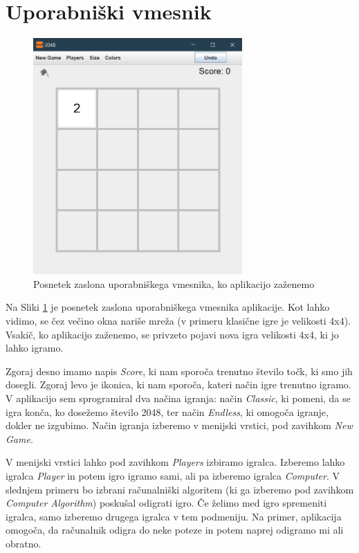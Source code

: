 \documentclass{article}
\begin{document}
\section{Uporabniški vmesnik}

\begin{figure}[ht!]
\centering
\includegraphics[width=8cm]{ui.jpg}
\caption{Posnetek zaslona uporabniškega vmesnika, ko aplikacijo zaženemo}
\label{ui}
\end{figure}

Na Sliki \ref{ui} je posnetek zaslona uporabniškega vmesnika aplikacije. Kot lahko vidimo, se čez večino okna nariše mreža (v primeru klasične igre je velikosti 4x4). Vsakič, ko aplikacijo zaženemo, se privzeto pojavi nova igra velikosti 4x4, ki jo lahko igramo. 

Zgoraj desno imamo napis \emph{Score}, ki nam sporoča trenutno število točk, ki smo jih dosegli. Zgoraj levo je ikonica, ki nam sporoča, kateri način igre trenutno igramo. V aplikacijo sem sprogramiral dva načina igranja: način \emph{Classic}, ki pomeni, da se igra konča, ko dosežemo število 2048, ter način \emph{Endless}, ki omogoča igranje, dokler ne izgubimo. Način igranja izberemo v menijski vrstici, pod zavihkom \emph{New Game}.

V menijski vrstici lahko pod zavihkom \emph{Players} izbiramo igralca. Izberemo lahko igralca \emph{Player} in potem igro igramo sami, ali pa izberemo igralca \emph{Computer}. V slednjem primeru bo izbrani računalniški algoritem (ki ga izberemo pod zavihkom \emph{Computer Algorithm}) poskušal odigrati igro. Če želimo med igro spremeniti igralca, samo izberemo drugega igralca v tem podmeniju. Na primer, aplikacija omogoča, da računalnik odigra do neke poteze in potem naprej odigramo mi ali obratno.
\end{document}
